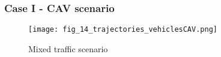 \begin{frame}
    \frametitle{Case I - CAV scenario}
    \begin{figure}
      \centering
      \texttt{[image: fig\_14\_trajectories\_vehiclesCAV.png]}
      \caption{Mixed traffic scenario}
    \end{figure}
\end{frame}